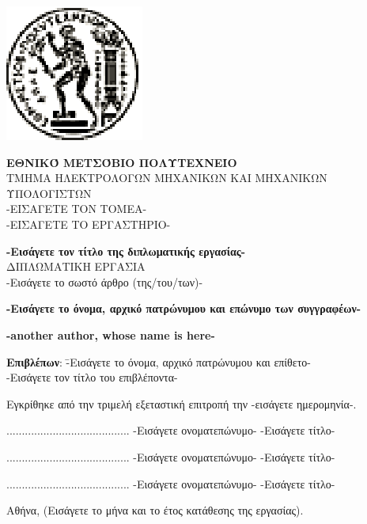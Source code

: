\documentclass[12pt, twoside, a4paper]{report}
\begin{document}
\maketitle
\newpage
\hspace{10pt}
\newpage
\includegraphics{pyrforos.eps}
\noindent
\parbox[b]{0.7\textwidth} {\textbf{
\noindent
\normalsize{ΕΘΝΙΚΌ}
\normalsize{ΜΕΤΣΌΒΙΟ}
\normalsize{ΠΟΛΥΤΕΧΝΕΊΟ}} \\
\small
TMHMA
ΗΛΕΚΤΡΟΛΟΓΩΝ
ΜΗΧΑΝΙΚΩΝ
ΚΑΙ
ΜΗΧΑΝΙΚΩΝ
ΥΠΟΛΟΓΙΣΤΩΝ \\
-ΕΙΣΑΓΕΤΕ ΤΟΝ ΤΟΜΕΑ- \\
-ΕΙΣΑΓΕΤΕ ΤΟ ΕΡΓΑΣΤΗΡΙΟ- \\
}

\begin{center}
\vspace{8ex}
\large \textbf{-Εισάγετε τον τίτλο της διπλωματικής εργασίας-} \\
\vspace{10ex}
\large
ΔΙΠΛΩΜΑΤΙΚΗ ΕΡΓΑΣΙΑ\\
\vspace{2ex}
\normalsize
-Εισάγετε το σωστό άρθρο (της/του/των)- \\
\vspace{2ex}
\parbox[c]{0.4\textwidth} { \center\textbf{
-Εισάγετε το όνομα, αρχικό πατρώνυμου και επώνυμο των συγγραφέων- }}
\parbox[c]{0.4\textwidth} { \center\textbf{
	-another author, whose name is here- }}
\vspace{10ex}
\flushleft
\begin{tabbing}
	\textbf{Επιβλέπων}: \= -Εισάγετε το όνομα, αρχικό πατρώνυμου
				και επίθετο- \\
			    \> -Εισάγετε τον τίτλο του επιβλέποντα-
\end{tabbing}
\end{center}

\noindent
Εγκρίθηκε από την τριμελή εξεταστική επιτροπή την -εισάγετε ημερομηνία-.

\begin{center}
\scriptsize
\parbox[b]{0.3\textwidth} {\center
	........................................
	-Εισάγετε ονοματεπώνυμο-
	-Εισάγετε τίτλο-
}
\parbox[b]{0.3\textwidth} {\center
	........................................
	-Εισάγετε ονοματεπώνυμο-
	-Εισάγετε τίτλο-
}
\parbox[b]{0.3\textwidth} {\center
	........................................
	-Εισάγετε ονοματεπώνυμο-
	-Εισάγετε τίτλο-
}
\end{center}
\vspace{10ex}
\normalsize
\noindent
Αθήνα, (Εισάγετε το μήνα και το έτος κατάθεσης της εργασίας).
\newpage
\hspace{10pt}
\end{document}
